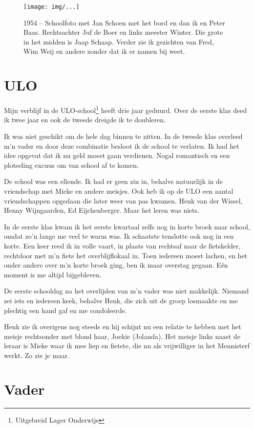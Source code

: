 \documentclass[10pt,twoside,openright]{memoir}
\begin{document}
\begin{figure}[t]
\texttt{[image: img/...]}
\caption{1954 – Schoolfoto met Jan Schoen met het bord en dan ik en Peter Baas. Rechtsachter Juf de Boer en links meester Winter. Die grote in het midden is Jaap Schaap. Verder zie ik gezichten van Fred, Wim Weij en andere zonder dat ik er namen bij weet.}
\end{figure}

\chapter{ULO} %
\label{cha:ulo}

Mijn verblijf in de ULO-school\footnote{Uitgebreid Lager Onderwijs} heeft drie jaar geduurd. Over de eerste klas deed ik twee jaar en ook de tweede dreigde ik te doubleren. 

Ik was niet geschikt om de hele dag binnen te zitten. In de tweede klas overleed m’n vader en door deze combinatie besloot ik de school te verlaten. Ik had het idee opgevat dat ik nu geld moest gaan verdienen. Nogal romantisch en een plotseling excuus om van school af te komen.  

De school was een ellende. Ik had er geen zin in, behalve natuurlijk in de vriendschap met Mieke en andere meisjes. Ook heb ik op de ULO een aantal vriendschappen opgedaan die later weer van pas kwamen. Henk van der Wissel, Henny Wijngaarden, Ed Eijchenberger. Maar het leren was niets. 

In de eerste klas kwam ik het eerste kwartaal zelfs nog in korte broek naar school, omdat zo’n lange me veel te warm was. Ik schaatste tenslotte ook nog in een korte. Een keer reed ik in volle vaart, in plaats van rechtsaf naar de fietskelder, rechtdoor met m’n fiets het overblijflokaal in. Toen iedereen moest lachen, en het onder andere over m’n korte broek ging, ben ik maar overstag gegaan. Eén moment is me altijd bijgebleven. 

De eerste schooldag na het overlijden van m’n vader was niet makkelijk. Niemand zei iets en iedereen keek, behalve Henk, die zich uit de groep losmaakte en me plechtig een hand gaf en me condoleerde. 

Henk zie ik overigens nog steeds en hij schijnt nu een relatie te hebben met het meisje rechtsonder met blond haar, Joekie (Jolanda). Het meisje links naast de leraar is Mieke waar ik mee liep en fietste, die nu als vrijwilliger in het Mennisterf werkt. Zo zie je maar.

\chapter{Vader} %
\label{cha:vader}
\end{document}
